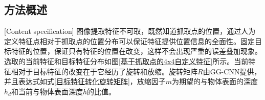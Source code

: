 \documentclass[fontset=fandol,type=bachelor,campus=harbin,bsmainpagenumberline=true]{hithesisbook}
\begin{document}
\subsection{方法概述}[Content specification]
图像提取特征不可取，既然知道抓取点的位置，通过人为定义特征点相对于抓取点的位置分布可以保证特征提供位置信息的全面性。固定目标特征的位置，保证只有特征的位置在改变，这样不会出现严重的误差叠加现象。选取的当前特征和目标特征分布如图\ref{基于抓取点的4x4自定义特征}所示。当前特征相对于目标特征的改变在于它经历了旋转和放缩。旋转矩阵$R$由GG-CNN提供，并且表达式如式\ref{目标特征转化旋转矩阵}，放缩因子$m$为期望的与物体表面的深度$h_d$和当前与物体表面深度$\bar{h}$的比值。
\begin{figure}[h]
	\centering
\end{figure}
\end{document}
